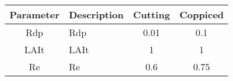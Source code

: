 \begin{tabularx}{\linewidth}{|cXcc|}
  \hline
  Parameter & Description & Cutting & Coppiced\\
\hline
\acs{Rdp} & \acf{Rdp} & 0.01 & 0.1\\
\ac{LAIt} & \acf{LAIt} & 1 & 1\\
\acs{Re} & \acf{Re} & 0.6 & 0.75\\
\hline
\end{tabularx}

